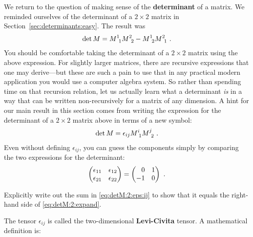 \documentclass[12pt, oneside]{report}    %
\begin{document}
We return to the question of making sense of the \textbf{determinant} of a matrix. We reminded ourselves of the determinant of a $2\times 2$ matrix in Section~\ref{sec:determinants:easy}. The result was
\begin{align}
    \det M = M\aij{1}{1}M\aij{2}{2} - M\aij{1}{2} M\aij{2}{1} \ .
    \label{eq:detM:2:expand}
\end{align}
You should be comfortable taking the determinant of a $2\times 2$ matrix using the above expression. For slightly larger matrices, there are recursive expressions that one may derive---but these are such a pain to use that in any practical modern application you would use a computer algebra system. So rather than spending time on that recursion relation, let us actually learn what a determinant \emph{is} in a way that can be written non-recursively for a matrix of any dimension. A hint for our main result in this section comes from writing the expression for the determinant of a $2\times 2$ matrix above in terms of a new symbol:
\begin{align}
    \det M = \epsilon_{ij}M\aij{i}{1} M\aij{j}{2} \ .
    \label{eq:detM:2:eps:ij}
\end{align}
Even without defining $\epsilon_{ij}$, you can guess the components simply by comparing the two expressions for the determinant:
\begin{align}
    \begin{pmatrix}
        \epsilon_{11} & \epsilon_{12} \\
        \epsilon_{21} & \epsilon_{22} 
    \end{pmatrix}
    =
    \begin{pmatrix}
        \pp 0 & 1 \\
        -1 & 0
    \end{pmatrix} \ .
\end{align}
\begin{exercise}
Explicitly write out the sum in \eqref{eq:detM:2:eps:ij} to show that it equals the right-hand side of \eqref{eq:detM:2:expand}.
\end{exercise}
The tensor $\epsilon_{ij}$ is called the two-dimensional \textbf{Levi-Civita} tensor. A mathematical definition is:
\end{document}
